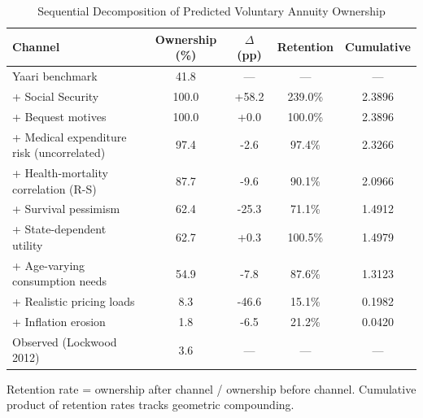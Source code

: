 \begin{table}[htbp]
\centering
\caption{Sequential Decomposition of Predicted Voluntary Annuity Ownership}
\label{tab:retention}
\begin{tabular}{lcccc}
\toprule
Channel & Ownership (\%) & $\Delta$ (pp) & Retention & Cumulative \\
\midrule
Yaari benchmark & 41.8 & --- & --- & --- \\
+ Social Security & 100.0 & +58.2 & 239.0\% & 2.3896 \\
+ Bequest motives & 100.0 & +0.0 & 100.0\% & 2.3896 \\
+ Medical expenditure risk (uncorrelated) & 97.4 & -2.6 & 97.4\% & 2.3266 \\
+ Health-mortality correlation (R-S) & 87.7 & -9.6 & 90.1\% & 2.0966 \\
+ Survival pessimism & 62.4 & -25.3 & 71.1\% & 1.4912 \\
+ State-dependent utility & 62.7 & +0.3 & 100.5\% & 1.4979 \\
+ Age-varying consumption needs & 54.9 & -7.8 & 87.6\% & 1.3123 \\
+ Realistic pricing loads & 8.3 & -46.6 & 15.1\% & 0.1982 \\
+ Inflation erosion & 1.8 & -6.5 & 21.2\% & 0.0420 \\
\midrule
Observed (Lockwood 2012) & 3.6 & --- & --- & --- \\
\bottomrule
\end{tabular}
\begin{tablenotes}
\small
\item Retention rate = ownership after channel / ownership before channel.
Cumulative product of retention rates tracks geometric compounding.
\end{tablenotes}
\end{table}
